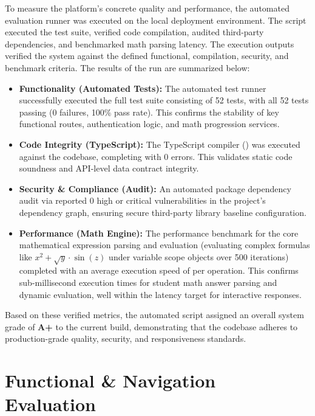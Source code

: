 To measure the platform's concrete quality and performance, the automated evaluation runner was executed on the local deployment environment. The script executed the test suite, verified code compilation, audited third-party dependencies, and benchmarked math parsing latency. The execution outputs verified the system against the defined functional, compilation, security, and benchmark criteria. The results of the run are summarized below:
\begin{itemize}
  \item \textbf{Functionality (Automated Tests):} The automated test runner successfully executed the full test suite consisting of 52 tests, with all 52 tests passing (0 failures, 100\% pass rate). This confirms the stability of key functional routes, authentication logic, and math progression services.
  \item \textbf{Code Integrity (TypeScript):} The TypeScript compiler () was executed against the codebase, completing with 0 errors. This validates static code soundness and API-level data contract integrity.
  \item \textbf{Security \& Compliance (Audit):} An automated package dependency audit via  reported 0 high or critical vulnerabilities in the project's dependency graph, ensuring secure third-party library baseline configuration.
  \item \textbf{Performance (Math Engine):} The performance benchmark for the core mathematical expression parsing and evaluation (evaluating complex formulas like $x^2 + \sqrt{y} \cdot \sin(z)$ under variable scope objects over 500 iterations) completed with an average execution speed of  per operation. This confirms sub-millisecond execution times for student math answer parsing and dynamic evaluation, well within the latency target for interactive responses.
\end{itemize}

Based on these verified metrics, the automated script assigned an overall system grade of \textbf{A+} to the current build, demonstrating that the codebase adheres to production-grade quality, security, and responsiveness standards.

\section{Functional \& Navigation Evaluation}

